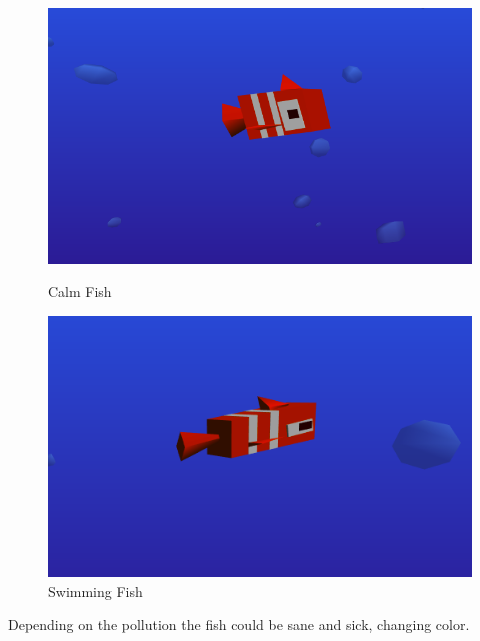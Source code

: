 \documentclass[a4paper,10pt]{article}
\begin{document}
\begin{figure}[H]
    \centering
    \begin{minipage}{0.45\textwidth}
        \centering
        \includegraphics[width=1\textwidth]{Screenshot_20190226_202521.png} %
        \caption{Calm Fish}
    \end{minipage}\hfill
    \begin{minipage}{0.45\textwidth}
        \centering
        \includegraphics[width=1\textwidth]{Screenshot_20190226_202616.png} %
        \caption{Swimming Fish}
    \end{minipage}
\end{figure}


Depending on the pollution the fish could be sane and sick, changing color.
\end{document}
